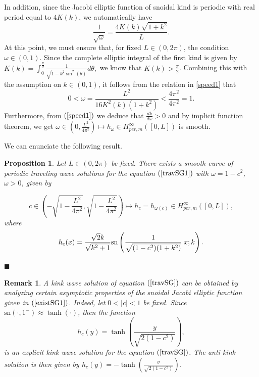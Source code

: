 \documentclass[12pt,reqno,a4paper]{amsart} %
\numberwithin{equation}{section}
\numberwithin{figure}{section}
\newtheorem{proposition}[theorem]{Proposition}
\newtheorem{remark}[theorem]{Remark}
\begin{document}
In addition, since the Jacobi elliptic function of snoidal kind is periodic with real period equal to $4K(k)$,
we automatically have
\begin{equation}\label{speed1}
\frac{1}{\sqrt{\omega}}=\frac{4K(k)\sqrt{1+k^2}}{L}.
\end{equation}
\indent At this point, we must ensure that, for fixed $L\in(0,2\pi)$, the condition $\omega\in (0,1)$. Since the complete elliptic integral of the first kind is given by $K(k)=\displaystyle\int_{0}^{\frac{\pi}{2}}\frac{1}{\sqrt{1-k^2\sin^2(\theta)}}d\theta,$ we know that $K(k)>\frac{\pi}{2}$. Combining this with the assumption on $k\in (0,1)$, it follows from the relation in \eqref{speed1} that
\begin{equation}\label{speed2}
0<\omega=\frac{L^2}{16K^2(k)(1+k^2)}<\frac{4\pi^2}{4\pi^2 }=1.
\end{equation}
Furthermore, from $(\ref{speed1})$ we deduce that
$\frac{dk}{d\omega}>0$ and by implicit function theorem, we
get
$\omega\in\left(0,\frac{L^2}{4\pi^2}\right)\mapsto h_\omega\in
H_{per,m}^\infty([0,L])$ is smooth. 



We can enunciate the following
result.


\begin{proposition}\label{prop.WS}
Let $L\in(0,2\pi)$ be fixed. There exists a smooth curve of
periodic traveling wave solutions for the equation $(\ref{travSG1})$
with $\omega=1-c^2$, $\omega>0$, given by

\begin{equation}
\displaystyle
c\in\left(-\sqrt{1-\frac{L^2}{4\pi^2}},\sqrt{1-\frac{L^2}{4\pi^2}}\right)
\mapsto h_{c}=h_{\omega(c)}\in H_{per,m}^\infty([0,L]),\label{curveeqSG1}\end{equation}
where
\begin{equation} 
	 h_{c}(x)=\frac{\sqrt{2}k}{\sqrt{k^2+1} }{\rm{sn}}\left(\frac{1}{\sqrt{(1-c^2)(1+k^2)}}\;x;k\right).\label{existSG1}
\end{equation}  
\end{proposition}

\begin{flushright}
 ${\blacksquare}$
\end{flushright}


\begin{remark}
 A \textit{kink wave} solution of equation $(\ref{travSG})$ can be obtained by analyzing certain asymptotic properties of the snoidal Jacobi elliptic function given in $(\ref{existSG1})$.  Indeed, let $0<|c|<1$ be fixed. Since
$\mbox{sn}(\cdot,1^{-})\approx \tanh(\cdot)$, then the function
\begin{equation}
h_{c}(y)=\tanh\left(\frac{y}{\sqrt{2(1-c^2)}}\right), \label{kink1} \end{equation}
is an explicit kink wave solution for the equation $(\ref{travSG})$. The anti-kink solution is then given by $h_{c}(y)=\displaystyle-\tanh\left(\frac{y}{\sqrt{2(1-c^2)}}\right)$.
\end{remark}
\end{document}
